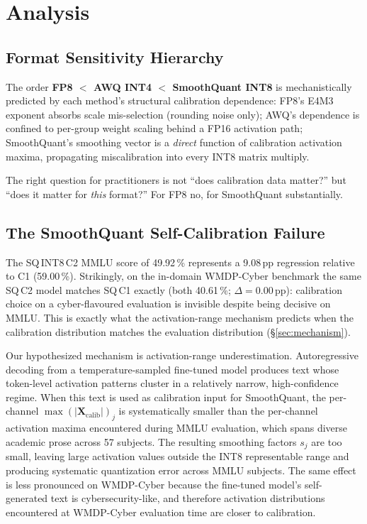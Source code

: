 \documentclass[11pt]{article}
\newcommand{\wmdp}{WMDP-Cyber}
\begin{document}
\section{Analysis}
\label{sec:analysis}

\subsection{Format Sensitivity Hierarchy}
\label{sec:hierarchy}

\begin{sloppypar}
The order \textbf{FP8 $<$ AWQ INT4 $<$ SmoothQuant INT8} is
mechanistically predicted by each method's structural calibration
dependence: FP8's E4M3 exponent absorbs scale mis-selection (rounding
noise only); AWQ's dependence is confined to per-group weight scaling
behind a FP16 activation path; SmoothQuant's smoothing vector is a
\emph{direct} function of calibration activation maxima, propagating
miscalibration into every INT8 matrix multiply.
\end{sloppypar}  The right question
for practitioners is not ``does calibration data matter?'' but
``does it matter for \emph{this} format?'' For FP8 no, for
SmoothQuant substantially.

\subsection{The SmoothQuant Self-Calibration Failure}
\label{sec:anomaly}

The SQ\,INT8\,C2 MMLU score of 49.92\,\% represents a 9.08\,pp regression
relative to C1 (59.00\,\%).  Strikingly, on the in-domain \wmdp{}
benchmark the same SQ\,C2 model matches SQ\,C1 exactly
(both 40.61\,\%; $\Delta = 0.00$\,pp): calibration choice on a
cyber-flavoured evaluation is invisible despite being decisive on
MMLU.  This is exactly what the activation-range mechanism predicts
when the calibration distribution matches the evaluation
distribution (\S\ref{sec:mechanism}).

Our hypothesized mechanism is activation-range underestimation.
Autoregressive decoding from a temperature-sampled fine-tuned model
produces text whose token-level activation patterns cluster in a
relatively narrow, high-confidence regime.  When this text is used as
calibration input for SmoothQuant, the per-channel
$\max(|\mathbf{X}_\text{calib}|)_j$ is systematically smaller than the
per-channel activation maxima encountered during MMLU evaluation, which
spans diverse academic prose across 57 subjects.  The resulting
smoothing factors $s_j$ are too small, leaving large activation values
outside the INT8 representable range and producing systematic
quantization error across MMLU subjects.  The same effect is less
pronounced on \wmdp{} because the fine-tuned model's self-generated
text is cybersecurity-like, and therefore activation distributions
encountered at \wmdp{} evaluation time are closer to calibration.
\end{document}
